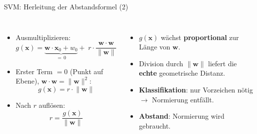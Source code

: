 \begin{frame}{SVM: Herleitung der Abstandsformel (2)}
\begin{columns}

\footnotesize
\begin{itemize}
  \item Ausmultiplizieren:
        \[
          g(\mathbf{x}) = \underbrace{\mathbf{w} \cdot \mathbf{x}_0 + w_0}_{= \, 0}
                        + \; r\cdot\frac{\mathbf{w} \cdot \mathbf{w}}{\lVert\mathbf{w}\rVert}
        \]
  \item Erster Term $= 0$ (Punkt auf Ebene), $\mathbf{w} \cdot \mathbf{w} =
        \lVert\mathbf{w}\rVert^2$:
        \[
          g(\mathbf{x}) = r\cdot\lVert\mathbf{w}\rVert
        \]
  \item Nach $r$ auflösen:
        \[
          \boxed{\,r = \frac{g(\mathbf{x})}{\lVert\mathbf{w}\rVert}\,}
        \]
\end{itemize}

\footnotesize
\begin{itemize}
  \item $g(\mathbf{x})$ wächst \textbf{proportional} zur Länge von
        $\mathbf{w}$.
  \item Division durch $\lVert\mathbf{w}\rVert$ liefert die \textbf{echte}
        geometrische Distanz.
  \item \textbf{Klassifikation}: nur Vorzeichen nötig $\rightarrow$ Normierung
        entfällt.
  \item \textbf{Abstand}: Normierung wird gebraucht.
\end{itemize}

\end{columns}
\end{frame}


